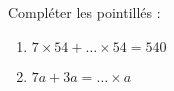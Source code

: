 
    \begin{mental}
        Compléter les pointillés :
        \begin{enumerate}
            \item
                \( 7\times 54+\ldots\times 54=540\)
            \item
                \( 7a+3a=\ldots\times a\)
        \end{enumerate}
    \end{mental}
